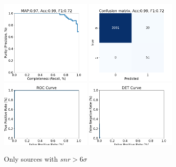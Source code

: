\documentclass[DM,authoryear,toc]{lsstdoc}
\begin{document}
\begin{figure}[h]
  \centering
  \includegraphics[width=0.4\textwidth]{precrec_13-resnet50-FullAugmentation-scratch-B64__0255000__npy_data_0.1.2-6sigma_256by256__posw_1.png}
  \includegraphics[width=0.4\textwidth]{confmat_13-resnet50-FullAugmentation-scratch-B64__0255000__npy_data_0.1.2-6sigma_256by256__posw_1.png}
  \includegraphics[width=0.4\textwidth]{roc_13-resnet50-FullAugmentation-scratch-B64__0255000__npy_data_0.1.2-6sigma_256by256__posw_1.png}
  \includegraphics[width=0.4\textwidth]{det_13-resnet50-FullAugmentation-scratch-B64__0255000__npy_data_0.1.2-6sigma_256by256__posw_1.png}
  \caption{Only sources with $snr > 6\sigma$}
  \label{fig:tract_templates}
\end{figure}
\end{document}
